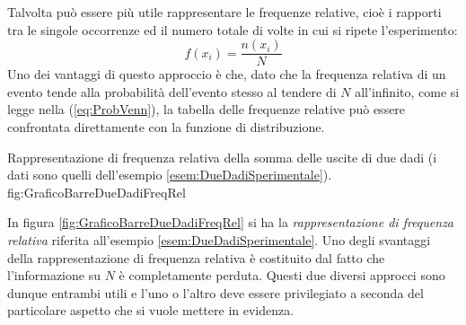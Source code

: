 Talvolta pu\`o essere pi\`u utile rappresentare le frequenze relative, cio\`e
i rapporti tra le singole occorrenze ed il numero totale di volte in cui
si ripete l'esperimento:
$$
f(x_i) = \frac{n(x_i)}{N}
$$
Uno dei vantaggi di questo approccio \`e che, dato che
la frequenza relativa di un evento tende alla probabilit\`a dell'evento
stesso al tendere di $N$ all'infinito, come si legge nella (\ref{eq:ProbVenn}),
la tabella delle frequenze relative pu\`o essere confrontata direttamente con
la funzione di distribuzione.

\begin{exemplify}


\end{exemplify}

\panelfig
{}
{Rappresentazione di frequenza relativa della somma delle uscite
di due dadi (i dati sono quelli dell'esempio \ref{esem:DueDadiSperimentale}).}
{fig:GraficoBarreDueDadiFreqRel}

\noindent In figura \ref{fig:GraficoBarreDueDadiFreqRel} si ha la
{\itshape rappresentazione di frequenza relativa} riferita all'esempio
\ref{esem:DueDadiSperimentale}.
Uno degli svantaggi della rappresentazione di frequenza relativa \`e
costituito dal fatto che l'informazione su $N$ \`e completamente perduta.
Questi due diversi approcci sono dunque entrambi utili e l'uno o
l'altro deve essere privilegiato a seconda del particolare aspetto che
si vuole mettere in evidenza.

